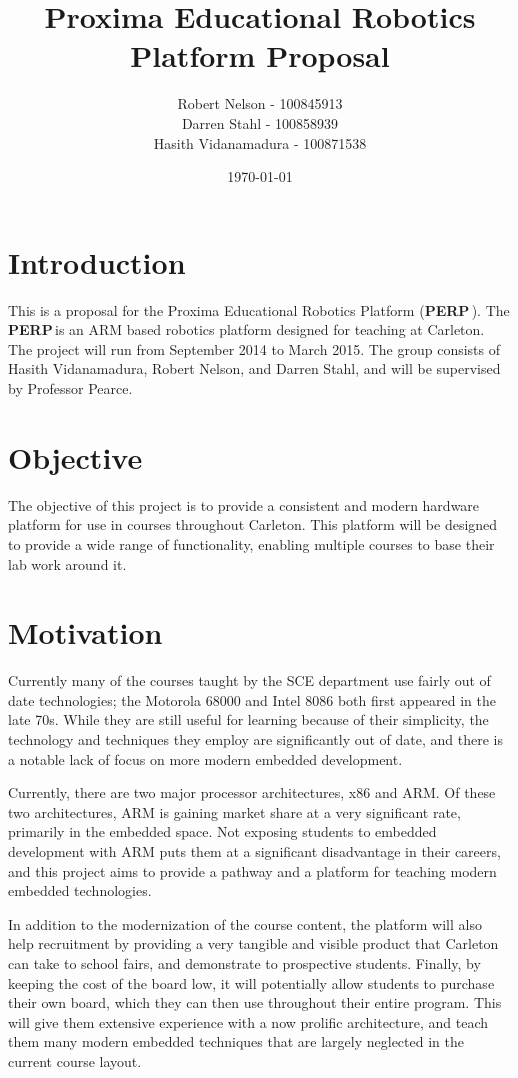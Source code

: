 \documentclass[letterpaper]{article}
\title{Proxima Educational Robotics Platform Proposal}
\author{
Robert Nelson - 100845913 \\
Darren Stahl - 100858939\\
Hasith Vidanamadura - 100871538
}
\date{\today}
\newcommand{\PERP}{\textbf{PERP}\,}
\begin{document}
\maketitle

\section{Introduction}

This is a proposal for the Proxima Educational Robotics Platform (\PERP). The \PERP is an ARM based robotics platform designed for teaching at Carleton. The project will run from September 2014 to March 2015. The group consists of Hasith Vidanamadura, Robert Nelson, and Darren Stahl, and will be supervised by Professor Pearce.

\section{Objective}

The objective of this project is to provide a consistent and modern hardware platform for use in courses throughout Carleton. This platform will be designed to provide a wide range of functionality, enabling multiple courses to base their lab work around it.

\section{Motivation}
Currently many of the courses taught by the SCE department use fairly out of date technologies; the Motorola 68000 and Intel 8086 both first appeared in the late 70s. While they are still useful for learning because of their simplicity, the technology and techniques they employ are significantly out of date, and there is a notable lack of focus on more modern embedded development.

Currently, there are two major processor architectures, x86 and ARM. Of these two architectures, ARM is gaining market share at a very significant rate, primarily in the embedded space. Not exposing students to embedded development with ARM puts them at a significant disadvantage in their careers, and this project aims to provide a pathway and a platform for teaching  modern embedded technologies. 

In addition to the modernization of the course content, the platform will also help recruitment by providing a very tangible and visible product that Carleton can take to school fairs, and demonstrate to prospective students. Finally, by keeping the cost of the board low, it will potentially allow students to purchase their own board, which they can then use throughout their entire program. This will give them extensive experience with a now prolific architecture, and teach them many modern embedded techniques that are largely neglected in the current course layout.
\end{document}
